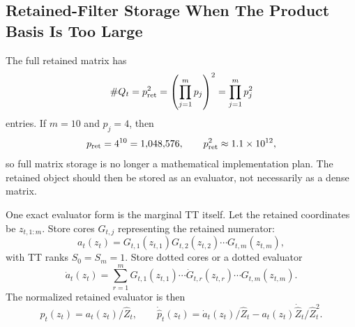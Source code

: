 \documentclass[11pt]{article}
\numberwithin{equation}{section}
\begin{document}
\subsection*{Retained-Filter Storage When The Product Basis Is Too Large}

The full retained matrix has
\begin{equation}
    \#Q_t=p_{\rm ret}^2
    =
    \left(\prod_{j=1}^{m}p_j\right)^2
    =
    \prod_{j=1}^{m}p_j^2
    \label{eq:p26-retained-storage-1}
\end{equation}
entries.  If \(m=10\) and \(p_j=4\), then
\begin{equation}
    p_{\rm ret}=4^{10}=1{,}048{,}576,
    \qquad
    p_{\rm ret}^2\approx 1.1\times10^{12},
    \label{eq:p26-retained-storage-2}
\end{equation}
so full matrix storage is no longer a mathematical implementation plan.  The
retained object should then be stored as an evaluator, not necessarily as a
dense matrix.

One exact evaluator form is the marginal TT itself.  Let the retained
coordinates be \(z_{t,1:m}\).  Store cores \(G_{t,j}\) representing the
retained numerator:
\begin{equation}
    a_t(z_t)
    =
    G_{t,1}(z_{t,1})G_{t,2}(z_{t,2})\cdots G_{t,m}(z_{t,m}),
    \label{eq:p26-retained-storage-3}
\end{equation}
with TT ranks \(S_0=S_m=1\).  Store dotted cores or a dotted evaluator
\begin{equation}
    \dot a_t(z_t)
    =
    \sum_{r=1}^{m}
    G_{t,1}(z_{t,1})\cdots
    \dot G_{t,r}(z_{t,r})\cdots
    G_{t,m}(z_{t,m}).
    \label{eq:p26-retained-storage-4}
\end{equation}
The normalized retained evaluator is then
\begin{equation}
    \widehat p_t(z_t)=a_t(z_t)/\widehat Z_t,
    \qquad
    \dot{\widehat p}_t(z_t)
    =
    \dot a_t(z_t)/\widehat Z_t
    -
    a_t(z_t)\dot{\widehat Z}_t/\widehat Z_t^2.
    \label{eq:p26-retained-storage-5}
\end{equation}
\end{document}
